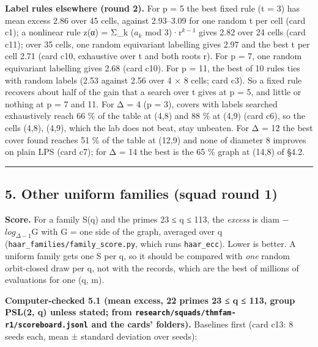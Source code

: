 \documentclass[
  10pt,
]{article}
\begin{document}
\textbf{Label rules elsewhere (round 2).} For p = 5 the best fixed rule
(t = 3) has mean excess 2.86 over 45 cells, against 2.93--3.09 for one
random t per cell (card c1); a nonlinear rule z(α) = Σ\_k (\(a_{k}\) mod
3)·r\(^{k−1}\) gives 2.82 over 24 cells (card c11); over 35 cells, one
random equivariant labelling gives 2.97 and the best t per cell 2.71
(card c10, exhaustive over t and both roots r). For p = 7, one random
equivariant labelling gives 2.68 (card c10). For p = 11, the best of 10
rules ties with random labels (2.53 against 2.56 over 4 × 8 cells; card
c3). So a fixed rule recovers about half of the gain that a search over
t gives at p = 5, and little or nothing at p = 7 and 11. For Δ = 4 (p =
3), covers with labels searched exhaustively reach 66 \% of the table at
(4,8) and 88 \% at (4,9) (card c6), so the cells (4,8), (4,9), which the
lab does not beat, stay unbeaten. For Δ = 12 the best cover found
reaches 51 \% of the table at (12,9) and none of diameter 8 improves on
plain LPS (card c7); for Δ = 14 the best is the 65 \% graph at (14,8) of
§4.2.

\begin{center}\rule{0.5\linewidth}{0.5pt}\end{center}

\hypertarget{other-uniform-families-squad-round-1}{%
\subsection{5. Other uniform families (squad round
1)}\label{other-uniform-families-squad-round-1}}

\textbf{Score.} For a family S(q) and the primes 23 ≤ q ≤ 113, the
\emph{excess} is diam − \(log_{Δ−1}\)\textbar G\textbar{} with
\textbar G\textbar{} = one side of the graph, averaged over q
(\texttt{haar\_families/family\_score.py}, which runs
\texttt{haar\_ecc}). Lower is better. A uniform family gets one S per q,
so it should be compared with \emph{one} random orbit-closed draw per q,
not with the records, which are the best of millions of evaluations for
one (q, m).

\textbf{Computer-checked 5.1 (mean excess, 22 primes 23 ≤ q ≤ 113, group
PSL(2, q) unless stated; from
\texttt{research/squads/thmfam-r1/scoreboard.jsonl} and the cards'
folders).} Baselines first (card c13: 8 seeds each, mean ± standard
deviation over seeds):
\end{document}
